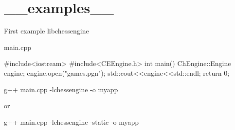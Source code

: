 \hypertarget{__examples__-example}{
\section{\_\-\_\-examples\_\-\_\-}
}
First example libchessengine


\begin{DoxyCode}
 main.cpp

#include<iostream>
#include<CEEngine.h>
int main()
{
    ChEngine::Engine engine;
    engine.open("games.pgn");
    std::cout<<engine<<std::endl;
    return 0;
}
\end{DoxyCode}


g++ main.cpp -\/lchessengine -\/o myapp

or

g++ main.cpp -\/lchessengine -\/static -\/o myapp


\begin{DoxyCodeInclude}
\end{DoxyCodeInclude}
 